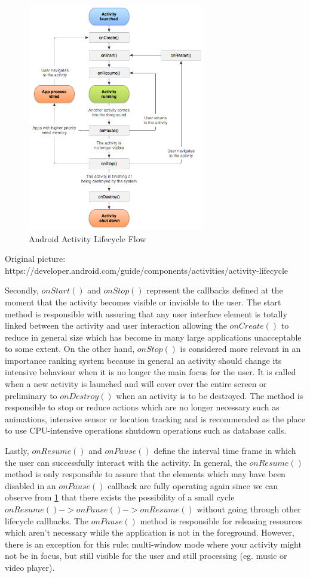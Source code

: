 \begin{figure}[H]
\centering
\includegraphics[height=10cm]{images/ActivityLifecycle.png} 
\caption{Android Activity Lifecycle Flow}
\label{fig:androidactivitylifecycle}
\end{figure}
\begin{flushright}
Original picture: https://developer.android.com/guide/components/activities/activity-lifecycle
\end{flushright}

Secondly, $onStart()$ and $onStop()$ represent the callbacks defined at the moment that the activity becomes visible or invisible to the user. The start method is responsible with assuring that any user interface element is totally linked between the activity and user interaction allowing the $onCreate()$ to reduce in general size which has become in many large applications unacceptable to some extent. On the other hand, $onStop()$ is considered more relevant in an importance ranking system because in general an activity should change its intensive behaviour when it is no longer the main focus for the user. It is called when a new activity is launched and will cover over the entire screen or preliminary to $onDestroy()$ when an activity is to be destroyed. The method is responsible to stop or reduce actions which are no longer necessary such as animations, intensive sensor or location tracking and is recommended as the place to use CPU-intensive operations shutdown operations such as database calls.

Lastly, $onResume()$ and $onPause()$ define the interval time frame in which the user can successfully interact with the activity. In general, the $onResume()$ method is only responsible to assure that the elements which may have been disabled in an $onPause()$ callback are fully operating again since we can observe from \ref{fig:androidactivitylifecycle} that there exists the possibility of a small cycle $onResume() -> onPause() -> onResume()$ without going through other lifecycle callbacks. The $onPause()$ method is responsible for releasing resources which aren't necessary while the application is not in the foreground. However, there is an exception for this rule: multi-window mode where your activity might not be in focus, but still visible for the user and still processing (eg. music or video player).

